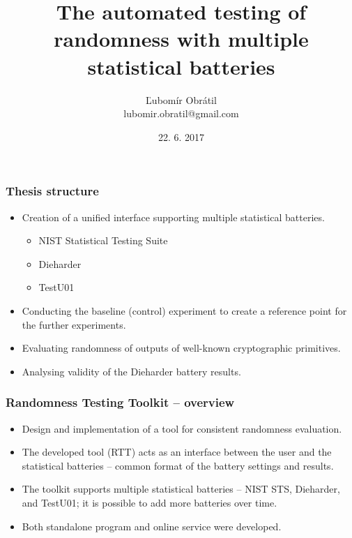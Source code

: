 \documentclass[aspectratio=169]{beamer}
\title[Randomness Testing Toolkit]{The automated testing of randomness with multiple statistical batteries}
\author[lubomir.obratil@gmail.com]{Ľubomír Obrátil\\lubomir.obratil@gmail.com}
\date{22. 6. 2017}
\begin{document}
\begin{frame}
\titlepage %
\end{frame}

\begin{frame}
\frametitle{Thesis structure}

\begin{itemize}
\item Creation of a unified interface supporting multiple statistical batteries.
\begin{itemize}
\item NIST Statistical Testing Suite
\item Dieharder
\item TestU01
\end{itemize}
\item Conducting the baseline (control) experiment to create a reference point for the further experiments.
\item Evaluating randomness of outputs of well-known cryptographic primitives.
\item Analysing validity of the Dieharder battery results.
\end{itemize}

\end{frame}

\begin{frame}
\frametitle{Randomness Testing Toolkit -- overview}
\begin{itemize}
\item Design and implementation of a tool for consistent randomness evaluation.
\item The developed tool (RTT) acts as an interface between the user and the statistical batteries -- common format of the battery settings and results.
\item The toolkit supports multiple statistical batteries -- NIST STS, Dieharder, and TestU01; it is possible to add more batteries over time.
\item Both standalone program and online service were developed.
\end{itemize}
\end{frame}
\end{document}
